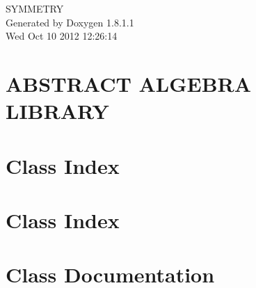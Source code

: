 \documentclass{book}
\begin{document}
\hypersetup{pageanchor=false,citecolor=blue}
\begin{titlepage}
\vspace*{7cm}
\begin{center}
{\Large S\-Y\-M\-M\-E\-T\-R\-Y }\\
\vspace*{1cm}
{\large Generated by Doxygen 1.8.1.1}\\
\vspace*{0.5cm}
{\small Wed Oct 10 2012 12:26:14}\\
\end{center}
\end{titlepage}
\clearemptydoublepage
{}
\tableofcontents
\clearemptydoublepage
{}
\hypersetup{pageanchor=true,citecolor=blue}
\chapter{A\-B\-S\-T\-R\-A\-C\-T A\-L\-G\-E\-B\-R\-A L\-I\-B\-R\-A\-R\-Y}
\label{index}\hypertarget{index}{}
\chapter{Class Index}

\chapter{Class Index}

\chapter{Class Documentation}





























\printindex
\end{document}
